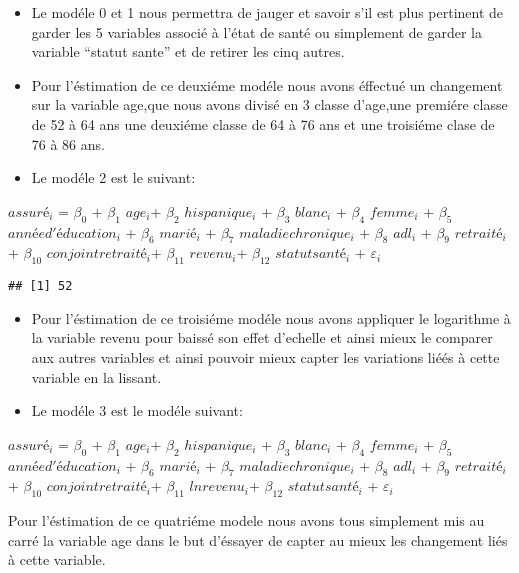 \documentclass[
  14pt,
  french,
]{article}
\begin{document}
\begin{itemize}
\item
  Le modéle 0 et 1 nous permettra de jauger et savoir s'il est plus
  pertinent de garder les 5 variables associé à l'état de santé ou
  simplement de garder la variable ``statut sante'' et de retirer les
  cinq autres.
\item
  Pour l'éstimation de ce deuxiéme modéle nous avons éffectué un
  changement sur la variable age,que nous avons divisé en 3 classe
  d'age,une premiére classe de 52 à 64 ans une deuxiéme classe de 64 à
  76 ans et une troisiéme clase de 76 à 86 ans.
\item
  Le modéle 2 est le suivant:
\end{itemize}

\begin{center}
$assuré_i$ = $\beta_0$  + $\beta_1$ $age_i$+ $\beta_2$ $hispanique_i$ + $\beta_3$ $blanc_i$ + $\beta_4$ $femme_i$  + $\beta_{5}$ $année d'éducation_i$ + $\beta_{6}$ $marié_i$ + $\beta_7$ $maladie chronique_i$  + $\beta_{8}$ $adl_i$ + $\beta_{9}$ $retraité_i$ + $\beta_{10}$ $conjoint retraité_i$+ $\beta_{11}$ $revenu_i$+ $\beta_{12}$ $statut santé_i$ + $\varepsilon_i$ 
\end{center}

\begin{verbatim}
## [1] 52
\end{verbatim}

\begin{itemize}
\item
  Pour l'éstimation de ce troisiéme modéle nous avons appliquer le
  logarithme à la variable revenu pour baissé son effet d'echelle et
  ainsi mieux le comparer aux autres variables et ainsi pouvoir mieux
  capter les variations liéés à cette variable en la lissant.
\item
  Le modéle 3 est le modéle suivant:
\end{itemize}

\begin{center}
$assuré_i$ = $\beta_0$  + $\beta_1$ $age_i$+ $\beta_2$ $hispanique_i$ + $\beta_3$ $blanc_i$ + $\beta_4$ $femme_i$  + $\beta_{5}$ $année d'éducation_i$ + $\beta_{6}$ $marié_i$ + $\beta_7$ $maladie chronique_i$  + $\beta_{8}$ $adl_i$ + $\beta_{9}$ $retraité_i$ + $\beta_{10}$ $conjoint retraité_i$+ $\beta_{11}$ $lnrevenu_i$+ $\beta_{12}$ $statut santé_i$ + $\varepsilon_i$ 
\end{center}

Pour l'éstimation de ce quatriéme modele nous avons tous simplement mis
au carré la variable age dans le but d'éssayer de capter au mieux les
changement liés à cette variable.
\end{document}

